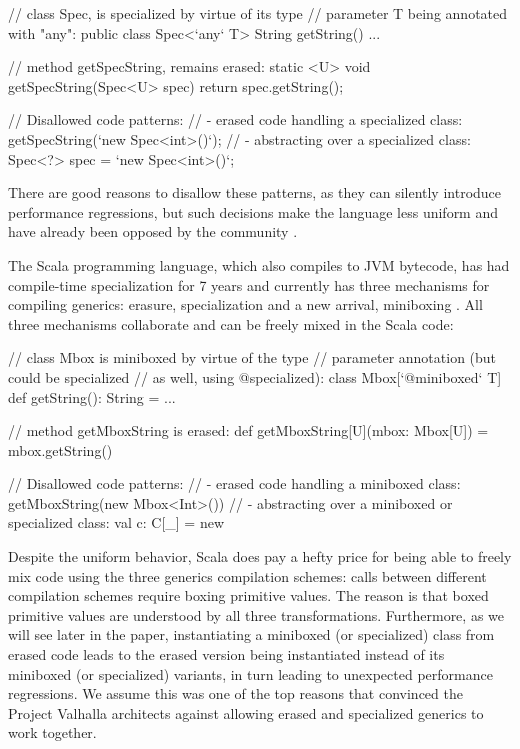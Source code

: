 \begin{lstlisting-nobreak}
// class Spec, is specialized by virtue of its type
// parameter T being annotated with "any":
public class Spec<`any` T> {
  String getString() { ... }
}

// method getSpecString, remains erased:
static <U> void getSpecString(Spec<U> spec) {
  return spec.getString();
}

// Disallowed code patterns:
//  - erased code handling a specialized class:
getSpecString(`new Spec<int>()`);
//  - abstracting over a specialized class:
Spec<?> spec = `new Spec<int>()`;
\end{lstlisting-nobreak}

There are good reasons to disallow these patterns, as they can silently introduce performance regressions, but such decisions make the language less uniform and have already been opposed by the community \cite{king-valhalla-email}.

The Scala programming language, which also compiles to JVM bytecode, has had compile-time specialization for 7 years \cite{iuli-thesis, specialization-iuli} and currently has three mechanisms for compiling generics: erasure, specialization and a new arrival, miniboxing \cite{miniboxing}. All three mechanisms collaborate and can be freely mixed in the Scala code:

\begin{lstlisting-nobreak}
// class Mbox is miniboxed by virtue of the type
// parameter annotation (but could be specialized
// as well, using @specialized):
class Mbox[`@miniboxed` T] {
  def getString(): String = ...
}

// method getMboxString is erased:
def getMboxString[U](mbox: Mbox[U]) = mbox.getString()

// Disallowed code patterns:
//  - erased code handling a miniboxed class:
getMboxString(new Mbox<Int>())
//  - abstracting over a miniboxed or specialized class:
val c: C[_] = new
\end{lstlisting-nobreak}

Despite the uniform behavior, Scala does pay a hefty price for being able to freely mix code using the three generics compilation schemes: calls between different compilation schemes require boxing primitive values. The reason is that boxed primitive values are understood by all three transformations. Furthermore, as we will see later in the paper, instantiating a miniboxed (or specialized) class from erased code leads to the erased version being instantiated instead of its miniboxed (or specialized) variants, in turn leading to unexpected performance regressions. We assume this was one of the top reasons that convinced the Project Valhalla architects against allowing erased and specialized generics to work together.

